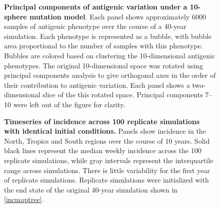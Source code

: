 \begin{figure}[!c]
	\centering
	\caption{\textbf{Principal components of antigenic variation under a 10-sphere mutation model}. Each panel shows approximately 6000 samples of antigenic phenotype over the course of a 40-year simulation.  Each phenotype is represented as a bubble, with bubble area proportional to the number of samples with this phenotype.  Bubbles are colored based on clustering the 10-dimensional antigenic phenotypes.  The original 10-dimensional space was rotated using principal components analysis to give orthogonal axes in the order of their contribution to antigenic variation.  Each panel shows a two-dimensional slice of the this rotated space.  Principal components 7--10 were left out of the figure for clarity.}
	\label{10dgrid}
\end{figure}

\pagebreak

\begin{figure}[!c]
	\centering
	\caption{\textbf{Timeseries of incidence across 100 replicate simulations with identical initial conditions.} Panels show incidence in the North, Tropics and South regions over the course of 10 years.  Solid black lines represent the median weekly incidence across the 100 replicate simulations, while gray intervals represent the interquartile range across simulations.  There is little variability for the first year of replicate simulations.  Replicate simulations were initialized with the end state of the original 40-year simulation shown in \ref{incmaptree}.}
	\label{replicatetimeseries}
\end{figure}


